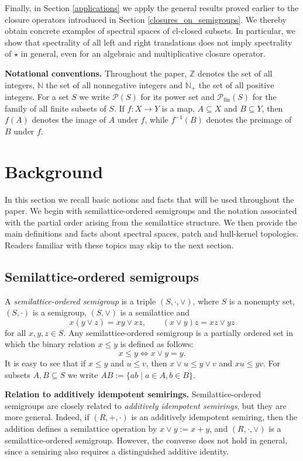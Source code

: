 \documentclass[10pt, reqno]{amsart}
\theoremstyle{plain}
\theoremstyle{definition}
\begin{document}
Finally, in Section \ref{applications} we apply the general results proved earlier to the closure operators introduced in Section \ref{closures_on_semigroups}. We thereby obtain concrete examples of spectral spaces of $\mathrm{cl}$-closed subsets. In particular, we show that spectrality of all left and right translations does not imply spectrality of $\star$ in general, even for an algebraic and multiplicative closure operator. 

\medskip
\noindent\textbf{Notational conventions.} Throughout the paper, $\mathbb{Z}$ denotes the set of all integers, $\mathbb{N}$ the set of all nonnegative integers and $\mathbb{N}_+$ the set of all positive integers. For a set $S$ we write $\mathcal{P}(S)$ for its power set and $\mathcal{P}_\mathrm{fin}(S)$ for the family of all finite subsets of $S$. If $f : X \rightarrow Y$ is a map, $A \subseteq X$ and $B \subseteq Y$, then $f(A)$ denotes the image of $A$ under $f$, while $f^{-1}(B)$ denotes the preimage of $B$ under $f$. 
\section{Background}\label{background}  
In this section we recall basic notions and facts that will be used throughout the paper. We begin with semilattice-ordered semigroups and the notation associated with the partial order arising from the semilattice structure. We then provide the main definitions and facts about spectral spaces, patch and hull-kernel topologies. Readers familiar with these topics may skip to the next section. 
\subsection{Semilattice-ordered semigroups}
A \emph{semilattice-ordered semigroup} is a triple $(S, \cdot, \lor)$, where $S$ is a nonempty set, $(S, \cdot)$ is a semigroup, $(S, \lor)$ is a semilattice and $$x(y \lor z) = xy \lor xz, \qquad (x \lor y)z = xz \lor yz$$ for all $x,y,z \in S$. Any semilattice-ordered semigroup is a partially ordered set in which the binary relation $x \leqslant y$ is defined as follows: $$x \leqslant y \iff x \lor y = y.$$ It is easy to see that if $x \leqslant y$ and $u \leqslant v$, then $x \lor u \leqslant y \lor v$ and $xu \leqslant yv$. For subsets $A, B\subseteq S$ we write $AB := \{ab \mid a\in A, b\in B\}$. 

\medskip \noindent 
\textbf{Relation to additively idempotent semirings.} Semilattice-ordered semigroups are closely related to \emph{additively idempotent semirings}, but they are more general. Indeed, if $(R, +, \cdot)$ is an additively idempotent semiring, then the addition defines a semilattice operation by $x \lor y := x + y$, and $(R, \cdot, \lor)$ is a semilattice-ordered semigroup. However, the converse does not hold in general, since a semiring also requires a distinguished additive identity. 
\end{document}
